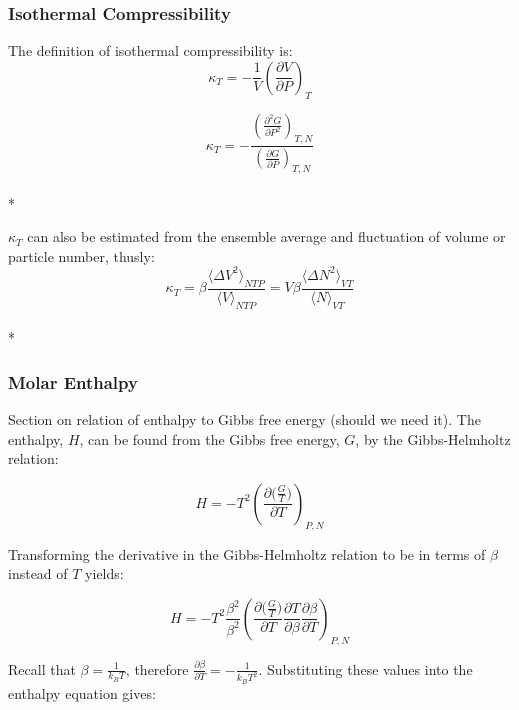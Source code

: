 \documentclass[a4paper,12pt]{article}
\begin{document}
\subsubsection{Isothermal Compressibility}
\noindent The definition of isothermal compressibility is:
\begin{equation}\kappa_T = -\frac{1}{V} \left(\frac{\partial V}{\partial P}\right)_T \end{equation}

\begin{equation}\kappa_T = -\frac{\left(\frac{\partial^2 G}{\partial P^2}\right)_{T, N}}{\left(\frac{\partial G}{\partial P}\right)_{T, N}}\end{equation}\\*

\noindent $\kappa_T$ can also be estimated from the ensemble average and fluctuation of volume or particle number, thusly\cite{comp}:
\begin{equation}\kappa_T = \beta \frac{\langle \Delta V^2 \rangle_{NTP}}{\langle V \rangle_{NTP}} = V \beta \frac{\langle \Delta N^2 \rangle_{VT}}{\langle N \rangle_{VT}}\end{equation}\\*


\subsubsection{Molar Enthalpy}
\noindent Section on relation of enthalpy to Gibbs free energy (should we need it).
\noindent The enthalpy, $H$, can be found from the Gibbs free energy, $G$, by the Gibbs-Helmholtz relation: 

\begin{equation}H=-T^2 \left(\frac{\partial \big(\frac{G}{T}\big)}{\partial T}\right)_{P,N}\end{equation}

\noindent Transforming the derivative in the Gibbs-Helmholtz relation to be in terms of $\beta$ instead of $T$ yields:

\begin{equation}H=-T^2  \frac{\beta^2}{\beta^2}\left(\frac{\partial \big(\frac{G}{T}\big)}{\partial T} \frac{\partial T}{\partial \beta} \frac{\partial \beta}{\partial T}\right)_{P,N}\end{equation}


\noindent Recall that $\beta = \frac{1}{k_B T}$, therefore $\frac{\partial \beta}{\partial T} = - \frac{1}{k_B T^2}$. Substituting these values into the enthalpy equation gives:
\end{document}
